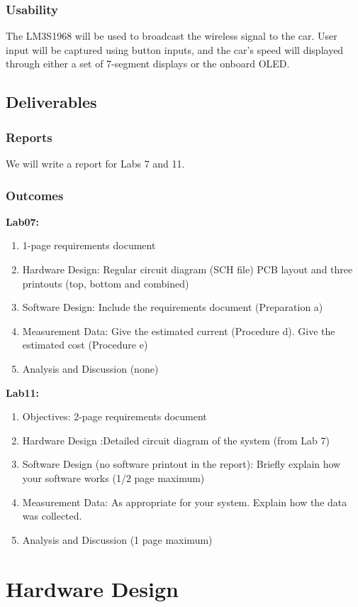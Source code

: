 \documentclass[twoside]{article}
\begin{document}
\subsubsection{Usability}
The LM3S1968 will be used to broadcast the wireless signal to the car. User input will be captured using button inputs, and the car's speed will displayed through either a set of 7-segment displays or the onboard OLED.
\subsection{Deliverables}
\subsubsection{Reports}
We will write a report for Labs 7 and 11.
\subsubsection{Outcomes}
\bf{Lab07:}
\begin{enumerate}
\item 1-page requirements document
\item Hardware Design: Regular circuit diagram (SCH file) PCB layout and three printouts (top, bottom and combined)
\item Software Design: Include the requirements document (Preparation a)
\item Measurement Data: Give the estimated current (Procedure d). Give the estimated cost (Procedure e)
\item Analysis and Discussion (none)
\end{enumerate}

\noindent \bf{Lab11:}
\begin{enumerate}
\item Objectives: 2-page requirements document
\item Hardware Design :Detailed circuit diagram of the system (from Lab 7)
\item Software Design (no software printout in the report): Briefly explain how your software works (1/2 page maximum)
\item Measurement Data: As appropriate for your system. Explain how the data was collected.
\item Analysis and Discussion (1 page maximum) 
\end{enumerate}

\section{Hardware Design}
\end{document}
